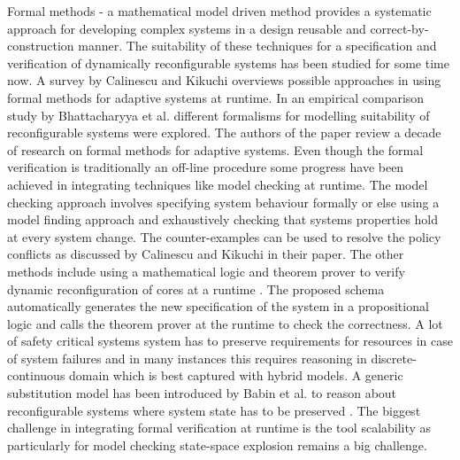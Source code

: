 \documentclass[conference]{IEEEtran}
\begin{document}


Formal methods - a mathematical model driven method provides a systematic approach
for developing complex systems in a design reusable and correct-by-construction
manner. The suitability of these techniques for a specification and verification of
dynamically reconfigurable systems has been studied for some time now. A survey by 
Calinescu and Kikuchi \cite{calinescu2010formal} overviews possible approaches in 
using formal methods for adaptive systems at runtime. In an empirical comparison
study by Bhattacharyya et al. \cite{DBLP:journals/corr/BhattacharyyaMP16}  different 
formalisms for modelling suitability of reconfigurable systems were explored. The authors of the paper 
\cite{Weyns:2012:SFM:2347583.2347592} review a decade of research on formal 
methods for adaptive systems. Even though the formal verification is traditionally 
an off-line procedure some progress have been achieved in integrating techniques like 
model checking at runtime. The model checking approach involves specifying system behaviour
formally or else using a model finding approach \cite{kikuchi2010configuration} 
and exhaustively checking that systems properties hold at every system change. 
The counter-examples can be used to resolve the policy conflicts as discussed by
Calinescu and Kikuchi in their paper. The other methods include using a mathematical logic and theorem prover  
to verify dynamic reconfiguration of cores at a runtime \cite{singh1999formal}. The proposed schema
automatically generates the new specification of the system in a propositional logic and calls
the theorem prover at the runtime to check the correctness. A lot of safety critical systems
system has to preserve requirements for resources in case of system failures and in many instances this requires 
reasoning in discrete-continuous domain which is best captured with hybrid models.
A generic substitution model has been introduced by Babin et al. to reason about reconfigurable
systems where system state has to be preserved \cite{Babin2016}. The biggest challenge in
integrating formal verification at runtime is the tool scalability as particularly for
model checking state-space explosion remains a big challenge.
\end{document}
